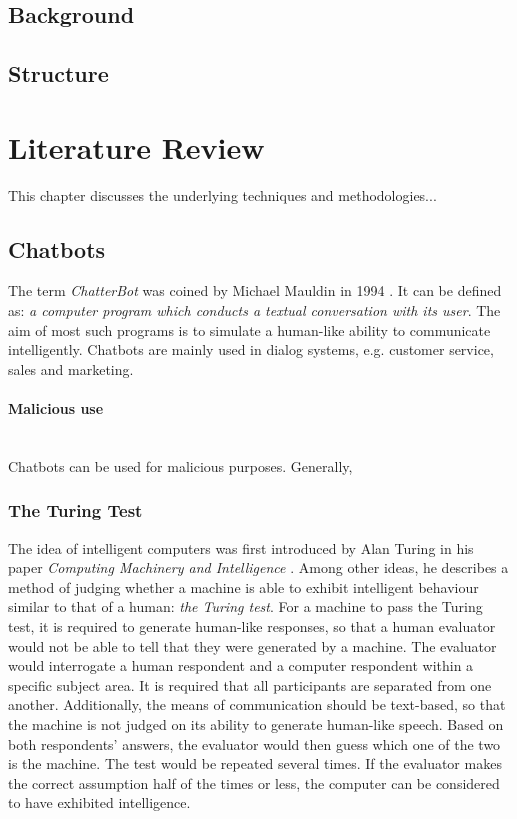 \documentclass[12pt,a4paper]{article}
\newcommand{\myparagraph}[1]{\paragraph{#1}\mbox{}\\}
\begin{document}
\subsection{Background}
\subsection{Structure}

\newpage
\section{Literature Review}
This chapter discusses the underlying techniques and methodologies...

\subsection{Chatbots}
The term \textit{ChatterBot} was coined by Michael Mauldin in 1994 \cite{Mauldin1994}. It can be defined as: \textit{a computer program which conducts a textual conversation with its user}. The aim of most such programs is to simulate a human-like ability to communicate intelligently. Chatbots are mainly used in dialog systems, e.g. customer service, sales and marketing.

\myparagraph{Malicious use}
Chatbots can be used for malicious purposes. Generally,

\subsubsection{The Turing Test}
The idea of intelligent computers was first introduced by Alan Turing in his paper \textit{Computing Machinery and Intelligence} \cite{Turing1950}. Among other ideas, he describes a method of judging whether a machine is able to exhibit intelligent behaviour similar to that of a human: \textit{the Turing test}. For a machine to pass the Turing test, it is required to generate human-like responses, so that a human evaluator would not be able to tell that they were generated by a machine. The evaluator would interrogate a human respondent and a computer respondent within a specific subject area. It is required that all participants are separated from one another. Additionally, the means of communication should be text-based, so that the machine is not judged on its ability to generate human-like speech. Based on both respondents' answers, the evaluator would then guess which one of the two is the machine. The test would be repeated several times. If the evaluator makes the correct assumption half of the times or less, the computer can be considered to have exhibited intelligence.
\end{document}
